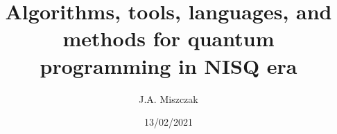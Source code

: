 \documentclass[11pt,a4paper]{report}
\title{Algorithms, tools, languages, and methods for quantum programming in NISQ era}
\author{J.A. Miszczak}
\date{13/02/2021}
\begin{document}
\maketitle


\begin{abstract}

\end{abstract}






\end{document}
